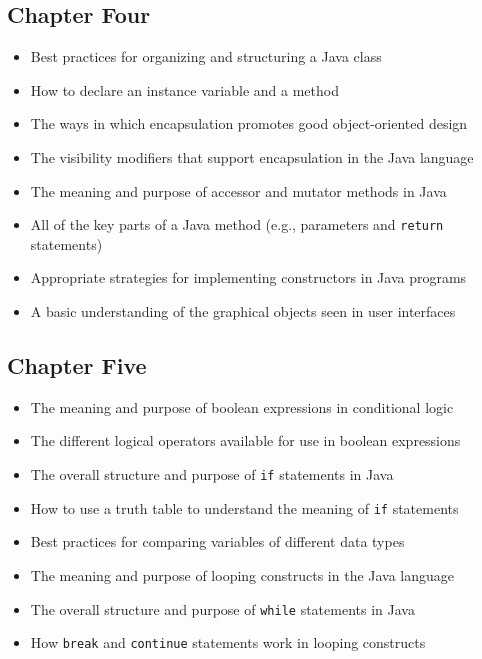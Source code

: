 \subsection*{Chapter Four}
\vspace*{-.1in}

\begin{itemize}

  \itemsep -.015in
  \item Best practices for organizing and structuring a Java class
  \item How to declare an instance variable and a method
  \item The ways in which encapsulation promotes good object-oriented design
  \item The visibility modifiers that support encapsulation in the Java language
  \item The meaning and purpose of accessor and mutator methods in Java
  \item All of the key parts of a Java method (e.g., parameters and {\tt return} statements)
  \item Appropriate strategies for implementing constructors in Java programs
  \item A basic understanding of the graphical objects seen in user interfaces

\end{itemize}

\vspace*{-.25in}
\subsection*{Chapter Five}
\vspace*{-.1in}

\begin{itemize}

  \itemsep -.015in
  \item The meaning and purpose of boolean expressions in conditional logic
  \item The different logical operators available for use in boolean expressions
  \item The overall structure and purpose of {\tt if} statements in Java
  \item How to use a truth table to understand the meaning of {\tt if} statements
  \item Best practices for comparing variables of different data types
  \item The meaning and purpose of looping constructs in the Java language
  \item The overall structure and purpose of {\tt while} statements in Java
  \item How {\tt break} and {\tt continue} statements work in looping constructs

\end{itemize}


